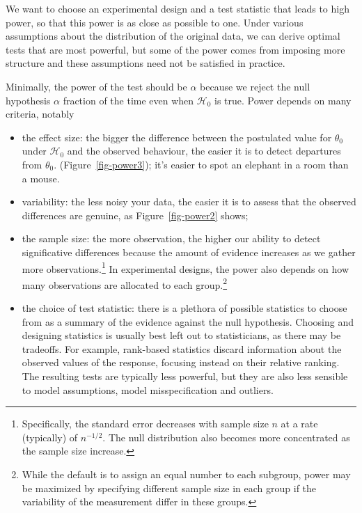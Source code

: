 \documentclass[
  11pt,
  letterpaper,
]{scrbook}
\providecommand{\tightlist}{%
  \setlength{\itemsep}{0pt}\setlength{\parskip}{0pt}}\usepackage{longtable,booktabs,array}
\theoremstyle{definition}
\theoremstyle{definition}
\theoremstyle{remark}
\begin{document}
We want to choose an experimental design and a test statistic that leads
to high power, so that this power is as close as possible to one. Under
various assumptions about the distribution of the original data, we can
derive optimal tests that are most powerful, but some of the power comes
from imposing more structure and these assumptions need not be satisfied
in practice.

Minimally, the power of the test should be \(\alpha\) because we reject
the null hypothesis \(\alpha\) fraction of the time even when
\(\mathscr{H}_0\) is true. Power depends on many criteria, notably

\begin{itemize}
\tightlist
\item
  the effect size: the bigger the difference between the postulated
  value for \(\theta_0\) under \(\mathscr{H}_0\) and the observed
  behaviour, the easier it is to detect departures from \(\theta_0\).
  (Figure~\ref{fig-power3}); it's easier to spot an elephant in a room
  than a mouse.
\item
  variability: the less noisy your data, the easier it is to assess that
  the observed differences are genuine, as Figure~\ref{fig-power2}
  shows;
\item
  the sample size: the more observation, the higher our ability to
  detect significative differences because the amount of evidence
  increases as we gather more observations.\footnote{Specifically, the
    standard error decreases with sample size \(n\) at a rate
    (typically) of \(n^{-1/2}\). The null distribution also becomes more
    concentrated as the sample size increase.} In experimental designs,
  the power also depends on how many observations are allocated to each
  group.\footnote{While the default is to assign an equal number to each
    subgroup, power may be maximized by specifying different sample size
    in each group if the variability of the measurement differ in these
    groups.}
\item
  the choice of test statistic: there is a plethora of possible
  statistics to choose from as a summary of the evidence against the
  null hypothesis. Choosing and designing statistics is usually best
  left out to statisticians, as there may be tradeoffs. For example,
  rank-based statistics discard information about the observed values of
  the response, focusing instead on their relative ranking. The
  resulting tests are typically less powerful, but they are also less
  sensible to model assumptions, model misspecification and outliers.
\end{itemize}
\end{document}

